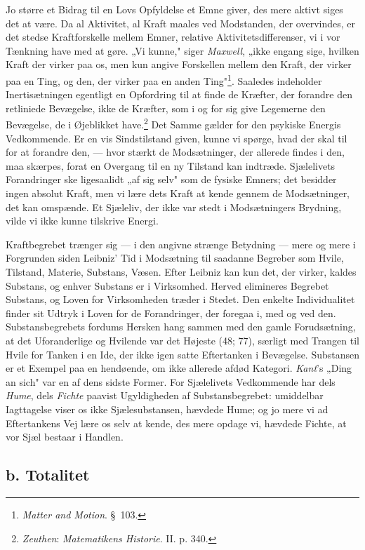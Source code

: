 \documentclass[12pt,a4paper]{book}
\newcommand{\opage}[1]{\marginnote{\footnotesize\textit{[#1]}}}
\newcommand{\apage}[1]{\marginnote{\footnotesize\textit{[#1]}}}
\begin{document}
\apage{217} Jo større et Bidrag til en Lovs Opfyldelse et Emne giver, des mere aktivt siges det
at være. Da al Aktivitet, al Kraft maales ved Modstanden, der overvindes, er det
stedse Kraftforskelle mellem Emner, relative Aktivitetsdifferenser, vi i vor
Tænkning have med at gøre. „Vi kunne," siger \emph{Maxwell}, „ikke engang sige,
hvilken Kraft der virker paa os, men kun angive Forskellen mellem den Kraft, der
virker paa en Ting, og den, der virker paa en anden Ting"\footnote{\emph{Matter and
Motion}. \S\ 103.}. Saaledes indeholder Inertisætningen egentligt en Opfordring til
at finde de Kræfter, der forandre den retliniede Bevægelse, ikke de Kræfter, som i
og for sig give Legemerne den Bevægelse, de i Øjeblikket have.\footnote{\emph{Zeuthen}:
\emph{Matematikens Historie}. II. p. 340.} Det Samme gælder for den psykiske Energis
Vedkommende. Er en vis Sindstilstand given, kunne vi spørge, hvad der skal til for
at forandre den, --- hvor stærkt de Modsætninger, der allerede findes i den, maa
skærpes, forat en Overgang til en ny Tilstand kan indtræde. Sjælelivets Forandringer
ske ligesaalidt „af sig selv" som de fysiske Emners; det besidder ingen absolut
Kraft, men vi lære dets Kraft at kende gennem de Modsætninger, det kan omspænde. Et
Sjæleliv, der ikke var stedt i Modsætningers Brydning, vilde vi ikke kunne tilskrive
Energi.

Kraftbegrebet trænger sig --- i den angivne strænge Betydning --- mere og mere i
Forgrunden siden Leibniz' Tid i Modsætning til saadanne Begreber som Hvile,
Tilstand, Materie, Substans, Væsen. Efter Leibniz kan kun det, der virker, kaldes
Substans, og enhver Substans er i Virksomhed. Herved elimineres Begrebet Substans,
og Loven for Virksomheden træder i Stedet. Den enkelte Individualitet finder sit
Udtryk i Loven for de Forandringer, der foregaa i, med og ved den.
Substansbegrebets fordums Hersken hang sammen med den gamle Forudsætning, at det
Uforanderlige og Hvilende var det Højeste (48; 77), særligt med Trangen til Hvile
for Tanken i en Ide, der ikke igen satte Eftertanken i Bevægelse. Substansen er et
Exempel paa en hendøende, om ikke allerede afdød Kategori. \emph{Kant}'s „Ding an
sich" var \opage{218} en af dens sidste Former. For Sjælelivets Vedkommende har dels
\emph{Hume}, dels \emph{Fichte} paavist Ugyldigheden af Substansbegrebet:
umiddelbar Iagttagelse viser os ikke Sjælesubstansen, hævdede Hume; og jo mere vi
ad Eftertankens Vej lære os selv at kende, des mere opdage vi, hævdede Fichte, at
vor Sjæl bestaar i Handlen.

\subsection*{b. Totalitet}
\end{document}
